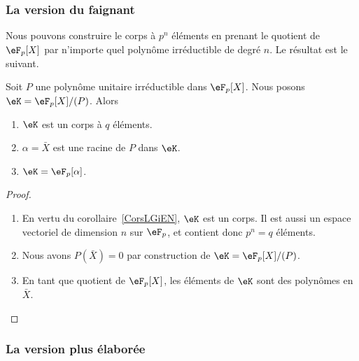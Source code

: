 \subsubsection{La version du faignant}

Nous pouvons construire le corps à \( p^n\) éléments en prenant le quotient de \( \eF_p[X]\) par n'importe quel polynôme irréductible de degré \( n\). Le résultat est le suivant.
\begin{proposition} \label{PropHfrNCB}
    Soit \( P\) une polynôme unitaire irréductible dans \( \eF_p[X]\). Nous posons \( \eK=\eF_p[X]/(P)\). Alors
    \begin{enumerate}
        \item
            \( \eK\) est un corps à \( q\) éléments.
        \item
            \( \alpha=\bar X\) est une racine de \( P\) dans \( \eK\).
        \item   \label{ItemiEFRTg}
            \( \eK=\eF_p[\alpha]\).
    \end{enumerate}
\end{proposition}

\begin{proof}
    \begin{enumerate}
        \item
            En vertu du corollaire~\ref{CorsLGiEN}, \( \eK\) est un corps. Il est aussi un espace vectoriel de dimension \( n\) sur \( \eF_p\), et contient donc \( p^n=q\) éléments.
        \item
            Nous avons \( P(\bar X)=0\) par construction de \( \eK=\eF_p[X]/(P)\).
        \item
            En tant que quotient de \( \eF_p[X]\), les éléments de \( \eK\) sont des polynômes en \( \bar X\).
    \end{enumerate}
\end{proof}

\subsubsection{La version plus élaborée}


